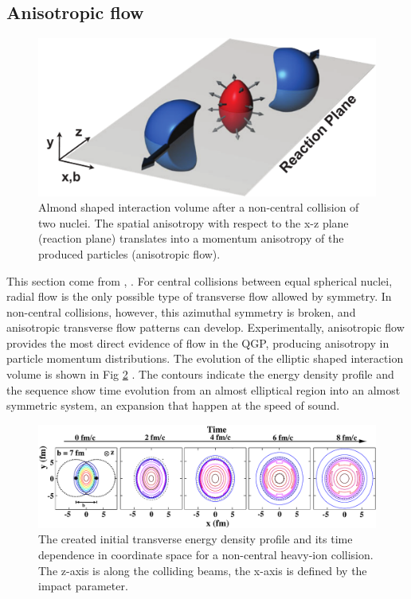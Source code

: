 \documentclass[12pt,a4paper]{book}
\begin{document}
	\subsection{Anisotropic flow}
	\begin{figure}[ht]
		\centering
		\includegraphics[width=0.8\linewidth]{pictures/elliptic_flow_collision.pdf}
		\caption{Almond shaped interaction volume after a non-central collision of two nuclei. The spatial anisotropy with respect to the x-z plane (reaction plane) translates into a momentum anisotropy of the produced particles (anisotropic flow).}
		\label{fig:elliptic_flow_collision} 
	\end{figure}
	This section come from \cite{Snellings_2011}, \cite{heinz2004conceptsheavyionphysics} \cite{Kolb_2000}. 
	For central collisions between equal spherical nuclei, radial flow is the only possible type of transverse flow allowed by symmetry. In non-central collisions, however, this azimuthal symmetry is broken, and anisotropic transverse flow patterns can develop. Experimentally, anisotropic flow provides the most direct evidence of flow in the QGP, producing anisotropy in particle momentum distributions. The evolution of the elliptic shaped interaction volume is shown in Fig \ref{fig:time_evolution_perepheral} \cite{kolb2003hydrodynamicdescriptionultrarelativisticheavyion}. The contours indicate the energy density profile and the sequence show time evolution from an almost elliptical region into an almost symmetric system, an expansion that happen at the speed of sound. 
	\begin{figure}[ht]
		\centering
		\includegraphics[width=0.8\linewidth]{pictures/timeEvolutionPerepheral.pdf}
		\caption{The created initial transverse energy density profile and its time dependence in coordinate space for a non-central heavy-ion collision. The z-axis is along the colliding beams, the x-axis is defined by the impact parameter.}
		\label{fig:time_evolution_perepheral} 
	\end{figure}
\end{document}
